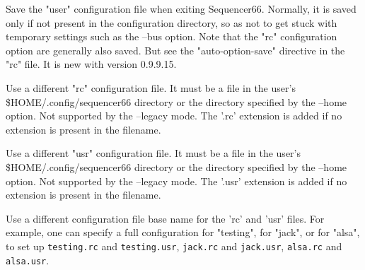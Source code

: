      Save the "user" configuration file when exiting Sequencer66.
      Normally, it is saved only if not present in the configuration directory,
      so as not to get stuck with temporary settings such as the --bus option.
      Note that the "rc" configuration option are generally also saved.
      But see the "auto-option-save" directive in the "rc" file.
      It is new with version 0.9.9.15.

      Use a different "rc" configuration file.  It must be a file in the user's
      \$HOME/.config/sequencer66 directory or the directory specified by the
      --home option.  Not supported by the --legacy mode.  The '.rc' extension
      is added if no extension is present in the filename.

      Use a different "usr" configuration file.  It must be a file in the
      user's \$HOME/.config/sequencer66 directory or the directory specified by
      the --home option.  Not supported by the --legacy mode.  The '.usr'
      extension is added if no extension is present in the filename.

      Use a different configuration file base name for the 'rc' and 'usr'
      files.  For example, one can specify a full configuration for "testing",
      for "jack", or for "alsa", to set up
      \texttt{testing.rc} and \texttt{testing.usr},
      \texttt{jack.rc} and \texttt{jack.usr},
      \texttt{alsa.rc} and \texttt{alsa.usr}.


